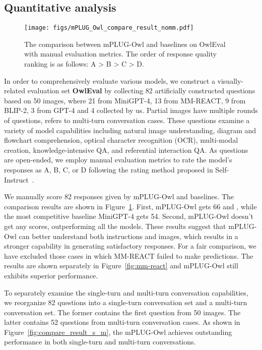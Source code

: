 \documentclass{article}
\newcommand{\modelname}{mPLUG-Owl\xspace}
\newcommand{\evalsetname}{OwlEval\xspace}
\begin{document}
 
\subsection{Quantitative analysis}

\begin{figure}[!ht]
    \centering
    \texttt{[image: figs/mPLUG\_Owl\_compare\_result\_nomm.pdf]}
    \caption{The comparison between mPLUG-Owl and baselines on \evalsetname with manual evaluation metrics. The order of response quality ranking is as follows: A > B > C > D.}
    \label{fig:compare_result}
    \vspace{-2mm}
\end{figure}

In order to comprehensively evaluate various models, we construct a visually-related evaluation set \textbf{\evalsetname} by collecting 82 artificially constructed questions based on 50 images, where 21 from MiniGPT-4, 13 from MM-REACT, 9 from BLIP-2, 3 from GPT-4 and 4 collected by us. Partial images have multiple rounds of questions, refers to multi-turn conversation cases. These questions examine a variety of model capabilities including natural image understanding, diagram and flowchart comprehension, optical character recognition (OCR), multi-modal creation, knowledge-intensive QA, and referential interaction QA. As questions are open-ended, we employ manual evaluation metrics to rate the model's responses as A, B, C, or D following the rating method proposed in Self-Instruct~\citep{self-instruct}. 



We manually score 82 responses given by \modelname and baselines. The comparison results are shown in Figure~\ref{fig:compare_result}. First, \modelname gets 66  and , while the most competitive baseline MiniGPT-4 gets 54. Second, \modelname doesn't get any  scores, outperforming all the models. These results suggest that \modelname can better understand both instructions and images, which results in a stronger capability in generating satisfactory responses. For a fair comparison, we have excluded those cases in which MM-REACT failed to make predictions. The results are shown separately in Figure~\ref{fig:mm-react} and \modelname still exhibits superior performance.


To separately examine the single-turn and multi-turn conversation capabilities, we reorganize 82 questions into a single-turn conversation set and a multi-turn conversation set. The former contains the first question from 50 images. The latter contains 52 questions from multi-turn conversation cases. As shown in Figure~\ref{fig:compare_result_s_m}, the \modelname achieves outstanding performance in both single-turn and multi-turn conversations.
\end{document}
